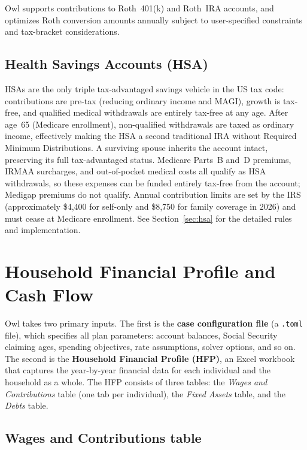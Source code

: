 \documentclass[fleqn,12pt]{report}
\begin{document}
Owl supports contributions to Roth~401(k) and Roth~IRA accounts, and
optimizes Roth conversion amounts annually subject to user-specified
constraints and tax-bracket considerations.

\subsection*{Health Savings Accounts (HSA)}

HSAs are the only triple tax-advantaged savings vehicle in the US tax code:
contributions are pre-tax (reducing ordinary income and MAGI), growth is
tax-free, and qualified medical withdrawals are entirely tax-free at any age.
After age~65 (Medicare enrollment), non-qualified withdrawals are taxed as
ordinary income, effectively making the HSA a second traditional IRA without
Required Minimum Distributions.
A surviving spouse inherits the account intact, preserving its full
tax-advantaged status.
Medicare Parts~B and~D premiums, IRMAA surcharges, and out-of-pocket
medical costs all qualify as HSA withdrawals, so these expenses can be
funded entirely tax-free from the account; Medigap premiums do not qualify.
Annual contribution limits are set by the IRS (approximately \$4,400 for
self-only and \$8,750 for family coverage in 2026) and must cease at Medicare
enrollment.
See Section~\ref{sec:hsa} for the detailed rules and implementation.

\section{Household Financial Profile and Cash Flow}
\label{sec:cfhfp}

Owl takes two primary inputs.
The first is the \textbf{case configuration file} (a \texttt{.toml} file),
which specifies all plan parameters: account balances, Social Security
claiming ages, spending objectives, rate assumptions, solver options, and so on.
The second is the \textbf{Household Financial Profile (HFP)}, an Excel
workbook that captures the year-by-year financial data for each individual
and the household as a whole.
The HFP consists of three tables: the \emph{Wages and Contributions} table
(one tab per individual), the \emph{Fixed Assets} table, and the
\emph{Debts} table.

\subsection*{Wages and Contributions table}
\end{document}
